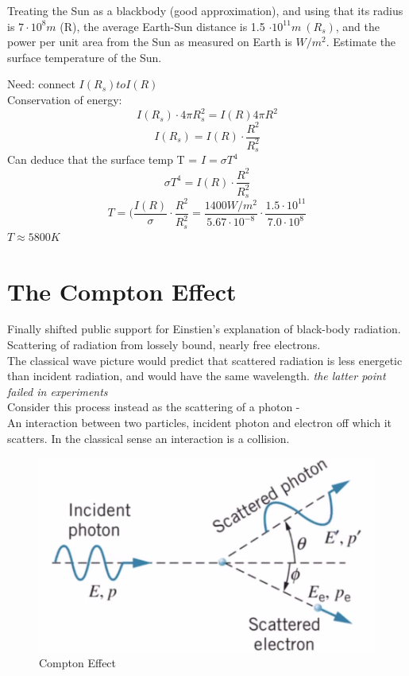 \documentclass[class=article,crop=false]{standalone}
\begin{document}
\begin{question}
	Treating the Sun as a blackbody (good approximation), and using that its radius is $7 \cdot 10^8 m$ (R), the average Earth-Sun distance is 1.5 $\cdot 10^{11} m\ (R_s)$, and the power per unit area from the Sun as measured on Earth is $W/m^2$. Estimate the surface temperature of the Sun.
	\begin{answer}[Answer]
		Need: connect $I(R_s) to I(R)$\\
		Conservation of energy:
		$$ I(R_s) \cdot 4 \pi R_s^2 = I(R) 4\pi R^2 $$
		$$ I(R_s) = I(R) \cdot \frac{R^2}{R_s^2} $$
		Can deduce that the surface temp T = $ I = \sigma T^4$
		$$ \sigma T^4 = I(R) \cdot \frac{R^2}{R_s^2} $$
		$$ T = (\frac{I(R)}{\sigma} \cdot \frac{R^2}{R_s^2} = \frac{1400 W/m^2}{5.67 \cdot 10^{-8}} \cdot \frac{1.5 \cdot 10^{11}}{7.0 \cdot 10^8} $$
		$ T \approx 5800 K $
	\end{answer}
\end{question}

\newpage
\section{The Compton Effect}

Finally shifted public support for Einstien's explanation of black-body radiation.\\

Scattering of radiation from lossely bound, nearly free electrons.\\

The classical wave picture would predict that scattered radiation is less energetic than incident radiation, and would have the same wavelength. \emph{the latter point failed in experiments}\\

Consider this process instead as the scattering of a photon - \\
An interaction between two particles, incident photon and electron off which it scatters. In the classical sense an interaction is a collision. \\

\begin{figure}[h!]
	\centering
	\includegraphics[width=.7\linewidth]{./Images/compton effect.png}
	\caption{Compton Effect}
\end{figure}
\end{document}

